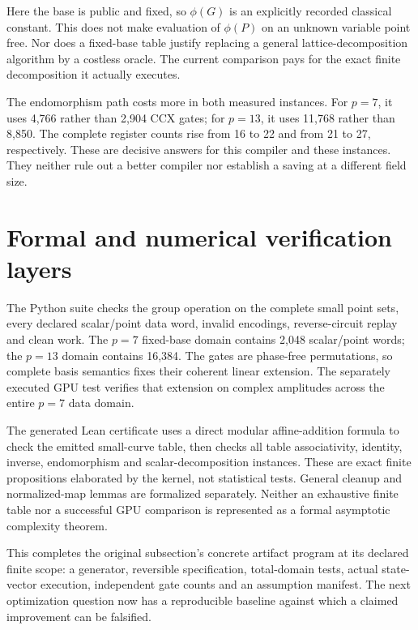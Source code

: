 Here the base is public and fixed, so $\phi(G)$ is an explicitly recorded classical constant. This does not make evaluation of $\phi(P)$ on an unknown variable point free. Nor does a fixed-base table justify replacing a general lattice-decomposition algorithm by a costless oracle. The current comparison pays for the exact finite decomposition it actually executes.

\begin{center}\small\end{center}

The endomorphism path costs more in both measured instances. For $p=7$, it uses 4,766 rather than 2,904 CCX gates; for $p=13$, it uses 11,768 rather than 8,850. The complete register counts rise from 16 to 22 and from 21 to 27, respectively. These are decisive answers for this compiler and these instances. They neither rule out a better compiler nor establish a saving at a different field size.

\section{Formal and numerical verification layers}

The Python suite checks the group operation on the complete small point sets, every declared scalar/point data word, invalid encodings, reverse-circuit replay and clean work. The $p=7$ fixed-base domain contains 2,048 scalar/point words; the $p=13$ domain contains 16,384. The gates are phase-free permutations, so complete basis semantics fixes their coherent linear extension. The separately executed GPU test verifies that extension on complex amplitudes across the entire $p=7$ data domain.

The generated Lean certificate uses a direct modular affine-addition formula to check the emitted small-curve table, then checks all table associativity, identity, inverse, endomorphism and scalar-decomposition instances. These are exact finite propositions elaborated by the kernel, not statistical tests. General cleanup and normalized-map lemmas are formalized separately. Neither an exhaustive finite table nor a successful GPU comparison is represented as a formal asymptotic complexity theorem.

This completes the original subsection's concrete artifact program at its declared finite scope: a generator, reversible specification, total-domain tests, actual state-vector execution, independent gate counts and an assumption manifest. The next optimization question now has a reproducible baseline against which a claimed improvement can be falsified.

